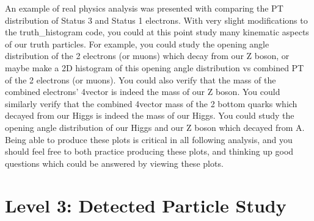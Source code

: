 \documentclass{article}
\begin{document}
An example of real physics analysis was presented with comparing the PT distribution of Status 3 and Status 1 electrons. With very slight modifications to the truth\_histogram code, you could at this point study many kinematic aspects of our truth particles. For example, you could study the opening angle distribution of the 2 electrons (or muons) which decay from our Z boson, or maybe make a 2D histogram of this opening angle distribution vs combined PT of the 2 electrons (or muons). You could also verify that the mass of the combined electrons' 4vector is indeed the mass of our Z boson. You could similarly verify that the combined 4vector mass of the 2 bottom quarks which decayed from our Higgs is indeed the mass of our Higgs. You could study the opening angle distribution of our Higgs and our Z boson which decayed from A. Being able to produce these plots is critical in all following analysis, and you should feel free to both practice producing these plots, and thinking up good questions which could be answered by viewing these plots.

\section{Level 3: Detected Particle Study}
\end{document}
